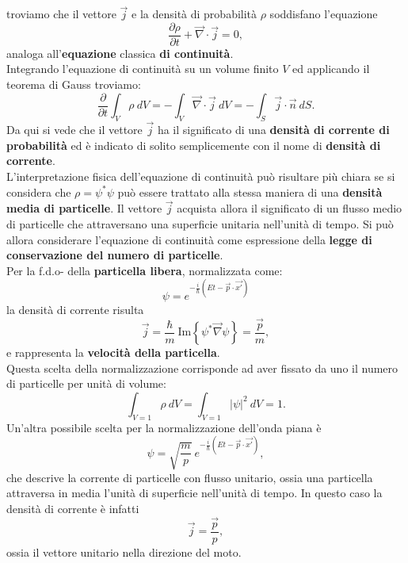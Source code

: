 troviamo che il vettore $\vec{j}$ e la densità di probabilità $\rho$ soddisfano l'equazione
\begin{equation}
\frac{\partial \rho}{\partial t}+ \vec{\nabla}\cdot\vec{j}=0,
\end{equation}
analoga all'\textbf{equazione} classica \textbf{di continuità}.\\
Integrando l'equazione di continuità su un volume finito $V$ ed applicando il teorema di Gauss troviamo:
\begin{equation}
\frac{\partial }{\partial t} \int _V \rho\ dV = - \int _V \vec{\nabla}\cdot\vec{j}\ dV = -\int _S \vec{j}\cdot\vec{n}\ dS.
\end{equation}
Da qui si vede che il vettore $\vec{j}$ ha il significato di una \textbf{densità di corrente di probabilità} ed è indicato di solito semplicemente con il nome di \textbf{densità di corrente}.\\
L'interpretazione fisica dell'equazione di continuità può risultare più chiara se si considera che $\rho= \psi^* \psi$ può essere trattato alla stessa maniera di una \textbf{densità media di particelle}. Il vettore $\vec{j}$ acquista allora il significato di un flusso medio di particelle che attraversano una superficie unitaria nell'unità di tempo. Si può allora considerare l'equazione di continuità come espressione della \textbf{legge di conservazione del numero di particelle}.\\
Per la f.d.o- della \textbf{particella libera}, normalizzata come:
\begin{equation}
\psi  =  e^{-\frac{i}{\hbar} (Et - \vec{p}\cdot \vec{x'})}
\end{equation}
la densità di corrente risulta
\begin{equation}
\vec{j}= \frac{\hbar}{m}\ \textrm{Im}\left\{\psi ^* \vec{\nabla}\psi \right\}= \frac{\vec{p}}{m},
\end{equation}
e rappresenta la \textbf{velocità della particella}.\\
Questa scelta della normalizzazione corrisponde ad aver fissato da uno il numero di particelle per unità di volume:
\begin{equation}
\int _{V=1} \rho \ dV = \int _{V=1} \vert \psi \vert ^2 \ dV=1.
\end{equation}
Un'altra possibile scelta per la normalizzazione dell'onda piana è
\begin{equation}
\psi  = \sqrt{\frac{m}{p}}\ e^{-\frac{i}{\hbar} (Et - \vec{p}\cdot \vec{x'})},
\end{equation}
che descrive la corrente di particelle con flusso unitario, ossia una particella attraversa in media l'unità di superficie nell'unità di tempo. In questo caso la densità di corrente è infatti
\begin{equation}
\vec{j}=  \frac{\vec{p}}{p},
\end{equation}
ossia il vettore unitario nella direzione del moto.